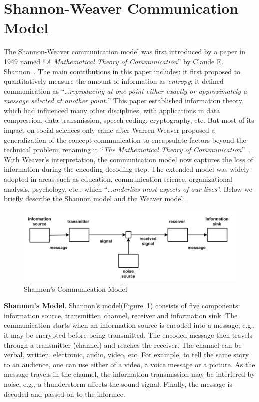 \section{Shannon-Weaver Communication Model}

The Shannon-Weaver communication model was first introduced by a paper in 1949 named ``\textit{A Mathematical Theory of Communication}'' by Claude E. Shannon~\cite{shannon1948mathematical}. The main contributions in this paper includes: it first proposed to quantitatively measure the amount of information as \textit{entropy}; it defined communication as ``\textit{\ldots reproducing at one point either exactly or approximately a message selected at another point.}'' This paper established information theory, which had influenced many other disciplines, with applications in data compression, data transmission, speech coding, cryptography, etc. But most of its impact on social sciences only came after Warren Weaver proposed a generalization of the concept communication to encapsulate factors beyond the technical problem, renaming it ``\textit{The Mathematical Theory of Communication}''~\cite{shannon1951mathematical}. With Weaver's interpretation, the communication model now captures the loss of information during the encoding-decoding step. The extended model was widely adopted in areas such as education, communication science, organizational analysis, psychology, etc., which ``\textit{\ldots underlies most aspects of our lives}''. Below we briefly describe the Shannon model and the Weaver model. 

\begin{figure}[h]
\centering
\includegraphics[width=.7\linewidth]{figure/chapter1/shannon}
\caption{Shannon's Communication Model~\cite{shannon1948mathematical}\label{fig:ch1:shannon}}
\end{figure}

\textbf{Shannon's Model}. Shannon's model(Figure~\ref{fig:ch1:shannon}) consists of five components: information source, transmitter, channel, receiver and information sink. The communication starts when an information source is encoded into a message, e.g., it may be encrypted before being transmitted. The encoded message then travels through a transmitter (channel) and reaches the receiver. The channel can be verbal, written, electronic, audio, video, etc. For example, to tell the same story to an audience, one can use either of a video, a voice message or a picture. As the message travels in the channel, the information transmission may be interfered by noise, e.g., a thunderstorm affects the sound signal. Finally, the message is decoded and passed on to the informee. 

